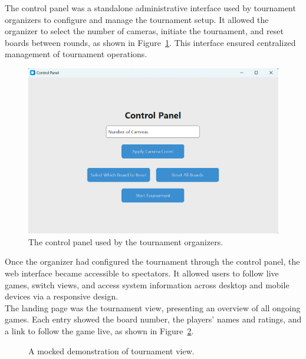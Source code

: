 The control panel was a standalone administrative interface used by tournament organizers to configure and manage the tournament setup. It allowed the organizer to select the number of cameras, initiate the tournament, and reset boards between rounds, as shown in Figure~\ref{fig:control-panel}. This interface ensured centralized management of tournament operations. \\

\begin{figure}[h!] \centering \includegraphics[width=0.65\linewidth]{figures/results/frontend/control-panel/control-panel.png} \caption[Display of control panel]{The control panel used by the tournament organizers.}\label{fig:control-panel} \end{figure}

Once the organizer had configured the tournament through the control panel, the web interface became accessible to spectators. It allowed users to follow live games, switch views, and access system information across desktop and mobile devices via a responsive design. \\

The landing page was the tournament view, presenting an overview of all ongoing games. Each entry showed the board number, the players' names and ratings, and a link to follow the game live, as shown in Figure~\ref{fig:tournament-view-mocked}. \\



\begin{figure}[h!] \centering {}\caption[Display of tournament view]{A mocked demonstration of tournament view.}\label{fig:tournament-view-mocked} \end{figure}


